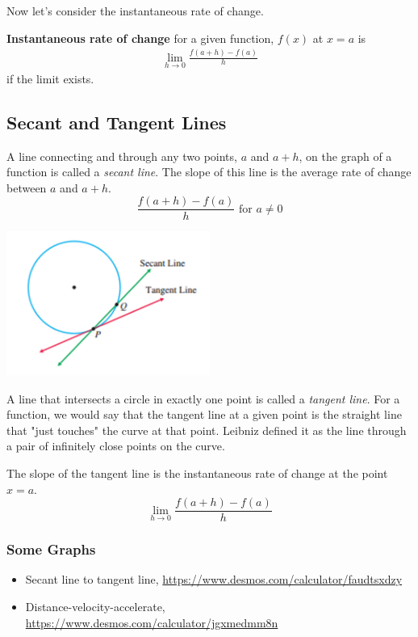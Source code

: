 \documentclass[14pt]{extarticle}
\begin{document}
Now let's consider the instantaneous rate of change.
\begin{tcolorbox}[enhanced jigsaw,colback=bg,boxrule=0pt,arc=0pt] 
	\textbf{Instantaneous rate of change} for a given function, $f(x)$ at $x=a$ is
	\begin{align*}
		\lim_{h\to 0}\frac{f(a+h)-f(a)}{h}
	\end{align*}
	if the limit exists.
\end{tcolorbox}

\subsection{Secant and Tangent Lines}
A line connecting and through any two points, $a$ and $a+h$, on the graph of a function is called a \textit{secant line}. The slope of this line is the average rate of change between $a$ and $a+h$.
$$\frac{f(a+h)-f(a)}{h} \text{ for }a\neq 0$$

\begin{center}
	\includegraphics[width=0.5\textwidth]{9-4-20a}
\end{center}
A line that intersects a circle in exactly one point is called a \textit{tangent line}. For a function, we would say that the tangent line at a given point is the straight line that "just touches" the curve at that point. Leibniz defined it as the line through a pair of infinitely close points on the curve.

The slope of the tangent line is the instantaneous rate of change at the point $x=a$.
$$\lim_{h\to 0}\frac{f(a+h)-f(a)}{h}$$

\subsubsection*{Some Graphs}
\begin{itemize}
	\item Secant line to tangent line, \url{https://www.desmos.com/calculator/faudtsxdzy}
	\item Distance-velocity-accelerate, \url{https://www.desmos.com/calculator/jgxmedmm8n}
\end{itemize}
\end{document}

